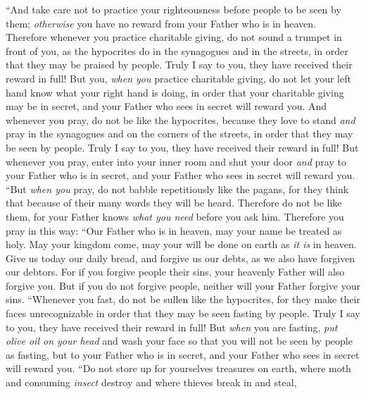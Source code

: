 \begin{biblechapter} %
 “And take care not to practice your righteousness before people to be seen by them; \textit{otherwise} you have no reward from your Father who is in heaven.
\verse Therefore whenever you practice charitable giving, do not sound a trumpet in front of you, as the hypocrites do in the synagogues and in the streets, in order that they may be praised by people. Truly I say to you, they have received their reward in full!
\verse But you, \textit{when you} practice charitable giving, do not let your left hand know what your right hand is doing,
\verse in order that your charitable giving may be in secret, and your Father who sees in secret will reward you.
 And whenever you pray, do not be like the hypocrites, because they love to stand \textit{and} pray in the synagogues and on the corners of the streets, in order that they may be seen by people. Truly I say to you, they have received their reward in full!
\verse But whenever you pray, enter into your inner room and shut your door \textit{and} pray to your Father who is in secret, and your Father who sees in secret will reward you.
\verse “But \textit{when you} pray, do not babble repetitiously like the pagans, for they think that because of their many words they will be heard.
\verse Therefore do not be like them, for your Father knows \textit{what you need} before you ask him.
\verse Therefore you pray in this way:
\verse “Our Father who is in heaven, 
may your name be treated as holy.
\verse May your kingdom come, 
may your will be done 
on earth as \textit{it is} in heaven.
\verse Give us today our daily bread,
\verse and forgive us our debts, 
as we also have forgiven our debtors.
\verse For if you forgive people their sins, your heavenly Father will also forgive you.
\verse But if you do not forgive people, neither will your Father forgive your sins.
 “Whenever you fast, do not be sullen like the hypocrites, for they make their faces unrecognizable in order that they may be seen fasting by people. Truly I say to you, they have received their reward in full!
\verse But \textit{when} you are fasting, \textit{put olive oil on your head} and wash your face
\verse so that you will not be seen by people as fasting, but to your Father who is in secret, and your Father who sees in secret will reward you.
 “Do not store up for yourselves treasures on earth, where moth and consuming \textit{insect} destroy and where thieves break in and steal,

\end{biblechapter}
